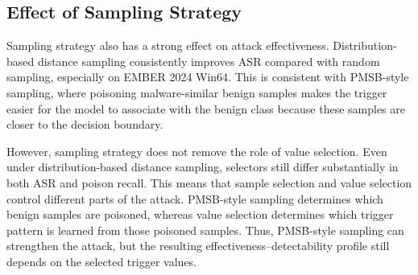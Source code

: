 \subsection{Effect of Sampling Strategy}
Sampling strategy also has a strong effect on attack effectiveness.
Distribution-based distance sampling consistently improves ASR compared with random sampling, especially on EMBER 2024 Win64.
This is consistent with PMSB-style sampling, where poisoning malware-similar benign samples makes the trigger easier for the model to associate with the benign class because these samples are closer to the decision boundary.

However, sampling strategy does not remove the role of value selection.
Even under distribution-based distance sampling, selectors still differ substantially in both ASR and poison recall.
This means that sample selection and value selection control different parts of the attack.
PMSB-style sampling determines which benign samples are poisoned, whereas value selection determines which trigger pattern is learned from those poisoned samples.
Thus, PMSB-style sampling can strengthen the attack, but the resulting effectiveness–detectability profile still depends on the selected trigger values.
